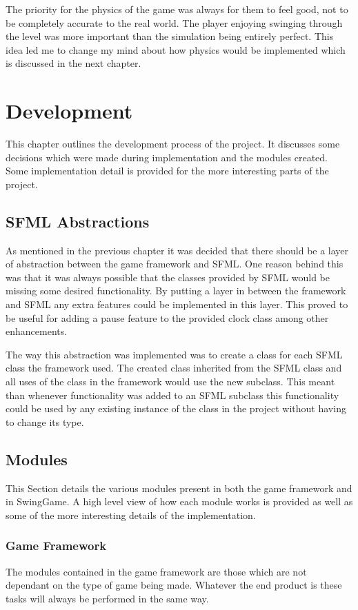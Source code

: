 \documentclass[]{report}
\begin{document}
	The priority for the physics of the game was always for them to feel good, not to be completely accurate to the real world. The player enjoying swinging through the level was more important than the simulation being entirely perfect. This idea led me to change my mind about how physics would be implemented which is discussed in the next chapter.

\chapter{Development}
This chapter outlines the development process of the project. It discusses some decisions which were made during implementation and the modules created. Some implementation detail is provided for the more interesting parts of the project.

	\section{SFML Abstractions}
	As mentioned in the previous chapter it was decided that there should be a layer of abstraction between the game framework and SFML. One reason behind this was that it was always possible that the classes provided by SFML would be missing some desired functionality. By putting a layer in between the framework and SFML any extra features could be implemented in this layer. This proved to be useful for adding a pause feature to the provided clock class among other enhancements.
	
	The way this abstraction was implemented was to create a class for each SFML class the framework used. The created class inherited from the SFML class and all uses of the class in the framework would use the new subclass. This meant than whenever functionality was added to an SFML subclass this functionality could be used by any existing instance of the class in the project without having to change its type.
	
	\section{Modules}
	This Section details the various modules present in both the game framework and in SwingGame. A high level view of how each module works is provided as well as some of the more interesting details of the implementation.
		\subsection{Game Framework}
		The modules contained in the game framework are those which are not dependant on the type of game being made. Whatever the end product is these tasks will always be performed in the same way.
\end{document}
